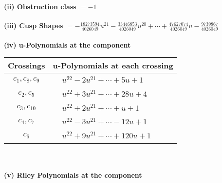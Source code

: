\documentclass[1p]{elsarticle_modified}
\theoremstyle{definition}
\begin{document}
\flushleft \textbf{(ii) Obstruction class $= -1$}\\~\\
\flushleft \textbf{(iii) Cusp Shapes $= -\frac{18273594}{4026049} u^{21}-\frac{33446853}{4026049} u^{20}+\cdots+\frac{47627074}{4026049} u-\frac{9739867}{4026049}$}\\~\\
\newpage\renewcommand{\arraystretch}{1}
\flushleft \textbf{(iv) u-Polynomials at the component}\newline \\
\begin{tabular}{m{50pt}|m{274pt}}
Crossings & \hspace{64pt}u-Polynomials at each crossing \\
\hline $$\begin{aligned}c_{1},c_{8},c_{9}\end{aligned}$$&$\begin{aligned}
&u^{22}-2 u^{21}+\cdots+5 u+1
\end{aligned}$\\
\hline $$\begin{aligned}c_{2},c_{5}\end{aligned}$$&$\begin{aligned}
&u^{22}+3 u^{21}+\cdots+28 u+4
\end{aligned}$\\
\hline $$\begin{aligned}c_{3},c_{10}\end{aligned}$$&$\begin{aligned}
&u^{22}+2 u^{21}+\cdots+u+1
\end{aligned}$\\
\hline $$\begin{aligned}c_{4},c_{7}\end{aligned}$$&$\begin{aligned}
&u^{22}-3 u^{21}+\cdots-12 u+1
\end{aligned}$\\
\hline $$\begin{aligned}c_{6}\end{aligned}$$&$\begin{aligned}
&u^{22}+9 u^{21}+\cdots+120 u+1
\end{aligned}$\\
\hline
\end{tabular}\\~\\
\newpage\renewcommand{\arraystretch}{1}
\flushleft \textbf{(v) Riley Polynomials at the component}\newline \\
\end{document}
